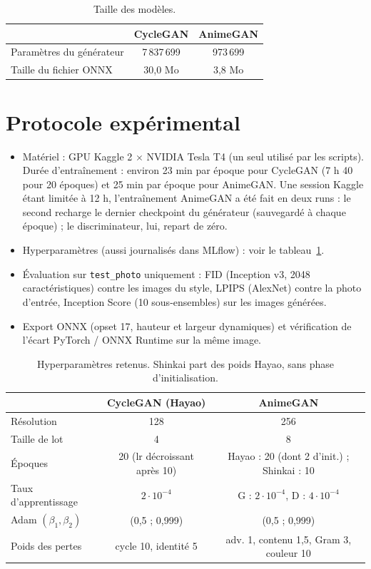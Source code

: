 \documentclass[11pt,a4paper]{article}
\begin{document}
\begin{table}[h]
\centering
\begin{tabular}{lcc}
\toprule
 & CycleGAN & AnimeGAN \\
\midrule
Paramètres du générateur & 7\,837\,699 & 973\,699 \\
Taille du fichier ONNX & 30,0 Mo & 3,8 Mo \\
\bottomrule
\end{tabular}
\caption{Taille des modèles.}
\end{table}

\section{Protocole expérimental}
\begin{itemize}
  \item Matériel : GPU Kaggle 2 $\times$ NVIDIA Tesla T4 (un seul utilisé par les scripts).
        Durée d'entraînement : environ 23 min par époque pour CycleGAN (7 h 40 pour 20
        époques) et 25 min par époque pour AnimeGAN. Une session Kaggle étant limitée à 12 h,
        l'entraînement AnimeGAN a été fait en deux runs : le second recharge le dernier
        checkpoint du générateur (sauvegardé à chaque époque) ; le discriminateur, lui,
        repart de zéro.
  \item Hyperparamètres (aussi journalisés dans MLflow) : voir le tableau~\ref{tab:hparams}.
  \item Évaluation sur \texttt{test\_photo} uniquement : FID (Inception v3, 2048
        caractéristiques) contre les images du style, LPIPS (AlexNet) contre la photo d'entrée, Inception Score (10 sous-ensembles) sur les images générées.
  \item Export ONNX (opset 17, hauteur et largeur dynamiques) et vérification de l'écart
        PyTorch / ONNX Runtime sur la même image.
\end{itemize}

\begin{table}[h]
\centering
\begin{tabular}{lcc}
\toprule
 & CycleGAN (Hayao) & AnimeGAN \\
\midrule
Résolution & 128 & 256 \\
Taille de lot & 4 & 8 \\
Époques & 20 (lr décroissant après 10) & Hayao : 20 (dont 2 d'init.) ; Shinkai : 10 \\
Taux d'apprentissage & $2\cdot10^{-4}$ & G : $2\cdot10^{-4}$, D : $4\cdot10^{-4}$ \\
Adam $(\beta_1, \beta_2)$ & (0,5 ; 0,999) & (0,5 ; 0,999) \\
Poids des pertes & cycle 10, identité 5 & adv. 1, contenu 1,5, Gram 3, couleur 10 \\
\bottomrule
\end{tabular}
\caption{Hyperparamètres retenus. Shinkai part des poids Hayao, sans phase d'initialisation.}
\label{tab:hparams}
\end{table}
\end{document}
